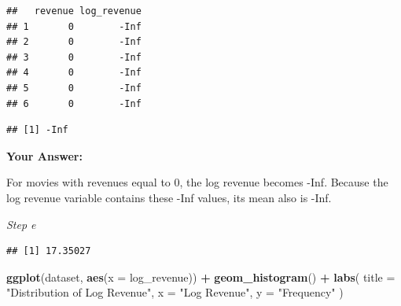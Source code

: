 \documentclass[
]{article}
\newenvironment{Shaded}{\begin{snugshade}}{\end{snugshade}}
\newcommand{\AttributeTok}[1]{\textcolor[rgb]{0.13,0.29,0.53}{#1}}
\newcommand{\CommentTok}[1]{\textcolor[rgb]{0.56,0.35,0.01}{\textit{#1}}}
\newcommand{\ConstantTok}[1]{\textcolor[rgb]{0.56,0.35,0.01}{#1}}
\newcommand{\FunctionTok}[1]{\textcolor[rgb]{0.13,0.29,0.53}{\textbf{#1}}}
\newcommand{\NormalTok}[1]{#1}
\newcommand{\OtherTok}[1]{\textcolor[rgb]{0.56,0.35,0.01}{#1}}
\newcommand{\SpecialCharTok}[1]{\textcolor[rgb]{0.81,0.36,0.00}{\textbf{#1}}}
\newcommand{\StringTok}[1]{\textcolor[rgb]{0.31,0.60,0.02}{#1}}
\begin{document}
\begin{verbatim}
##   revenue log_revenue
## 1       0        -Inf
## 2       0        -Inf
## 3       0        -Inf
## 4       0        -Inf
## 5       0        -Inf
## 6       0        -Inf
\end{verbatim}

\begin{Shaded}
\end{Shaded}

\begin{verbatim}
## [1] -Inf
\end{verbatim}

\textbf{Your Answer:}

For movies with revenues equal to 0, the log revenue becomes -Inf.
Because the log revenue variable contains these -Inf values, its mean
also is -Inf.

\emph{Step e}

\begin{Shaded}
\end{Shaded}

\begin{verbatim}
## [1] 17.35027
\end{verbatim}

\begin{Shaded}
\begin{Highlighting}[]
\FunctionTok{ggplot}\NormalTok{(dataset, }\FunctionTok{aes}\NormalTok{(}\AttributeTok{x =}\NormalTok{ log\_revenue)) }\SpecialCharTok{+}
  \FunctionTok{geom\_histogram}\NormalTok{() }\SpecialCharTok{+}
  \FunctionTok{labs}\NormalTok{(}
    \AttributeTok{title =} \StringTok{"Distribution of Log Revenue"}\NormalTok{,}
    \AttributeTok{x =} \StringTok{"Log Revenue"}\NormalTok{,}
    \AttributeTok{y =} \StringTok{"Frequency"}
\NormalTok{  )}
\end{Highlighting}
\end{Shaded}
\end{document}
